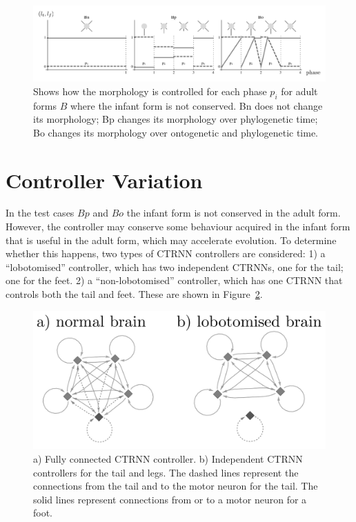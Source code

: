 \begin{figure}
  \centering
  \hspace*{-30pt} 
  \includegraphics[scale=1.0]{fig/morph-var-b.pdf} 
  \vspace{-15pt}
  \caption[Variations of morphological change]{\label{fig:morph-var-b}
    Shows how the morphology is controlled for each phase $p_i$ for
    adult forms $B$ where the infant form is not conserved.  Bn does not
    change its morphology; Bp changes its morphology over phylogenetic
    time; Bo changes its morphology over ontogenetic and phylogenetic
    time.}
\end{figure}



\section{Controller Variation}

In the test cases $Bp$ and $Bo$ the infant form is not conserved in
the adult form.  However, the controller may conserve some behaviour
acquired in the infant form that is useful in the adult form, which
may accelerate evolution.  To determine whether this happens, two
types of CTRNN controllers are considered: 1) a ``lobotomised''
controller, which has two independent CTRNNs, one for the tail; one
for the feet. 2) a ``non-lobotomised'' controller, which has one CTRNN
that controls both the tail and feet.  These are shown in
Figure~\ref{ctrnn-figures}.

\begin{figure}[h]
  \centering
  \includegraphics[width=5in]{fig/ctrnn-figures-gs.pdf} 
  \vspace{-15pt}
  \caption[Variation of CTRNN controllers]{\label{ctrnn-figures}a)
    Fully connected CTRNN controller. b) Independent CTRNN controllers
    for the tail and legs.  The dashed lines represent the connections
    from the tail and to the motor neuron for the tail.  The solid
    lines represent connections from or to a motor neuron for a
    foot. }
\end{figure}


